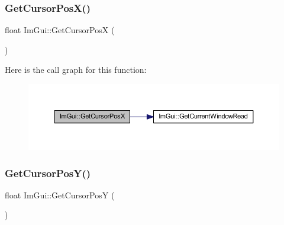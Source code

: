 \subsubsection{\texorpdfstring{Get\+Cursor\+Pos\+X()}{GetCursorPosX()}}
{\footnotesize\ttfamily float Im\+Gui\+::\+Get\+Cursor\+PosX (\begin{DoxyParamCaption}{ }\end{DoxyParamCaption})}

Here is the call graph for this function\+:
\nopagebreak
\begin{figure}[H]
\begin{center}
\leavevmode
\includegraphics[width=350pt]{namespace_im_gui_a022e32c808ac899e25847f4d65633b77_cgraph}
\end{center}
\end{figure}
\mbox{\label{namespace_im_gui_a86e409551f256b542166989c558d41c1}} 
\subsubsection{\texorpdfstring{Get\+Cursor\+Pos\+Y()}{GetCursorPosY()}}
{\footnotesize\ttfamily float Im\+Gui\+::\+Get\+Cursor\+PosY (\begin{DoxyParamCaption}{ }\end{DoxyParamCaption})}

